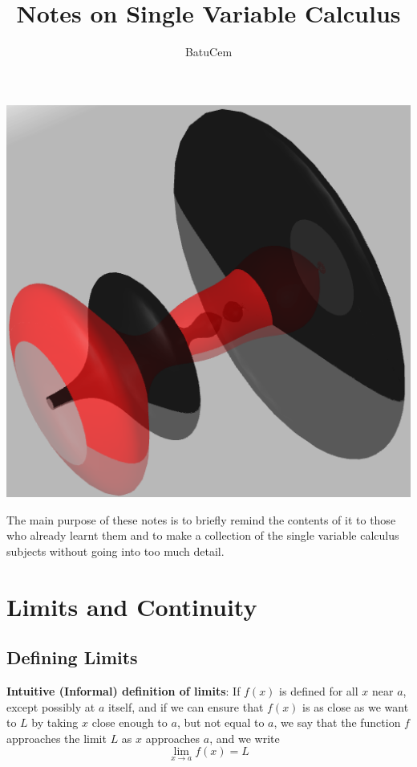 \documentclass[12pt]{article}
\begin{document}
\title{Notes on Single Variable Calculus}
\author{BatuCem}
\maketitle
\includegraphics[scale=1]{A.png}

\begin{small}
The main purpose of these notes is to briefly remind the contents of it to those who already learnt them and to make a collection of the single variable calculus subjects without going into too much detail.
\end{small}
\newpage
\tableofcontents
\newpage
\section{Limits and Continuity}
\subsection{Defining Limits}
\textbf{Intuitive (Informal) definition of limits}: If $f(x)$ is defined for all $x$ near $a$, except possibly at $a$ itself, and if we can
ensure that $f(x)$ is as close as we want to $L$ by taking $x$ close enough to $a$,
but not equal to $a$, we say that the function $f$ approaches the limit $L$ as $x$
approaches $a$, and we write $$\lim \limits_{x \to a} f(x)=L$$
\end{document}
